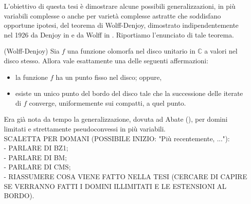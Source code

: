 L'obiettivo di questa tesi è dimostrare alcune possibili generalizzazioni, in più variabili complesse o anche per varietà complesse astratte che soddisfano opportune ipotesi, del teorema di Wolff-Denjoy, dimostrato indipendentemente nel 1926 da Denjoy in \cite{D} e da Wolff in \cite{Wo}. Riportiamo l'enunciato di tale teorema.

\begin{thm}
    (Wolff-Denjoy) Sia $f$ una funzione olomorfa nel disco unitario in $\mathbb{C}$ a valori nel disco stesso. Allora vale esattamente una delle seguenti affermazioni:
    \begin{itemize}
        \item la funzione $f$ ha un punto fisso nel disco; oppure,
        \item esiste un unico punto del bordo del disco tale che la successione delle iterate di $f$ converge, uniformemente sui compatti, a quel punto.
    \end{itemize}
\end{thm}

Era già nota da tempo la generalizzazione, dovuta ad Abate (\cite[Theorem 0.5]{A2}), per domini limitati e strettamente pseudoconvessi in più variabili.\\
SCALETTA PER DOMANI (POSSIBILE INIZIO: "Più recentemente, ..."):\\
- PARLARE DI BZ1;\\
- PARLARE DI BM;\\
- PARLARE DI CMS;\\
- RIASSUMERE COSA VIENE FATTO NELLA TESI (CERCARE DI CAPIRE SE VERRANNO FATTI I DOMINI ILLIMITATI E LE ESTENSIONI AL BORDO).
